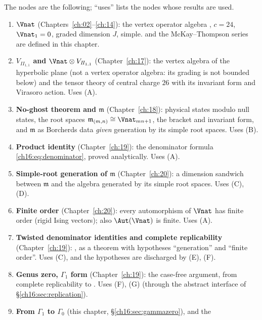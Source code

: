 The nodes are the following; ``uses'' lists the nodes whose results are used.
\begin{enumerate}[label=(\Alph*)]
\item\label{ch16:node:A} \textbf{$\Vnat$} (Chapters~\ref{ch:02}--\ref{ch:14}): the vertex operator algebra
  , $c=24$, $\Vnat_1=0$, graded dimension $J$, simple.   and the McKay--Thompson series are
  defined in this chapter.
\item\label{ch16:node:B} \textbf{$V_{I\!I_{1,1}}$ and $\Vnat\otimes V_{I\!I_{1,1}}$} (Chapter~\ref{ch:17}): the vertex
  algebra of the hyperbolic plane (not a vertex operator algebra: its grading is not bounded below) and the tensor
  theory of central charge $26$ with its invariant form and Virasoro action.  Uses (A).
\item\label{ch16:node:C} \textbf{No-ghost theorem and $\mathfrak m$} (Chapter~\ref{ch:18}): physical states modulo null
  states, the root spaces $\mathfrak m_{(m,n)}\cong\Vnat_{mn+1}$, the bracket and invariant form, and $\mathfrak m$ as
  Borcherds data \emph{given} generation by its simple root spaces.  Uses (B).
\item\label{ch16:node:D} \textbf{Product identity} (Chapter~\ref{ch:19}): the denominator formula
  \eqref{ch16:eq:denominator}, proved analytically.  Uses (A).
\item\label{ch16:node:E} \textbf{Simple-root generation of $\mathfrak m$} (Chapter~\ref{ch:20}): a dimension sandwich
  between $\mathfrak m$ and the algebra generated by its simple root spaces.  Uses (C), (D).
\item\label{ch16:node:F} \textbf{Finite order} (Chapter~\ref{ch:20}): every automorphism of $\Vnat$ has finite order
  (rigid Ising vectors); also $\Aut(\Vnat)$ is finite.  Uses (A).
\item\label{ch16:node:G} \textbf{Twisted denominator identities and complete replicability} (Chapter~\ref{ch:19}):
  , as a theorem with hypotheses ``generation'' and ``finite order''.  Uses (C), and the
  hypotheses are discharged by (E), (F).
\item\label{ch16:node:H} \textbf{Genus zero, $\Gamma_1$ form} (Chapter~\ref{ch:19}): the case-free argument, from complete
  replicability to .  Uses (F), (G) (through the abstract interface of
  \S\ref{ch16:sec:replication}).
\item\label{ch16:node:I} \textbf{From $\Gamma_1$ to $\Gamma_0$} (this chapter, \S\ref{ch16:sec:gammazero}), and the

\end{enumerate}
